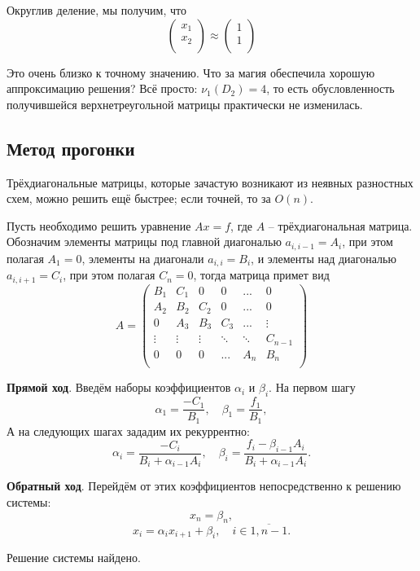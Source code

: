 \documentclass{article}
\begin{document}
\begin{example}
	Округлив деление, мы получим, что
	\[
		\begin{pmatrix}
			x_1 \\
			x_2 \\
		\end{pmatrix}
		\approx
		\begin{pmatrix}
			1 \\
			1 \\
		\end{pmatrix}
	\]

	Это очень близко к точному значению. Что за магия обеспечила хорошую
	аппроксимацию решения? Всё просто: $\nu_1(D_2)=4$, то есть
	обусловленность получившейся верхнетреугольной матрицы практически не
	изменилась.
\end{example}
\leavevmode

\subsection{Метод прогонки}
Трёхдиагональные матрицы, которые зачастую возникают из неявных разностных схем,
можно решить ещё быстрее; если точней, то за $O(n)$.

\begin{algorithm}
	Пусть необходимо решить уравнение $Ax=f$, где $A$ -- трёхдиагональная
	матрица. Обозначим элементы матрицы
	под главной диагональю $a_{i,i-1}=A_i$, при этом полагая $A_1=0$,
	элементы на диагонали $a_{i,i}=B_i$,
	и элементы над диагональю $a_{i,i+1}=C_i$, при этом полагая $C_n=0$,
	тогда матрица примет вид
	\[
		A=
		\begin{pmatrix}
			B_1	& C_1	& 0	& 0	& ...	& 0 \\
			A_2	& B_2	& C_2	& 0	& ...	& 0 \\
			0	& A_3	& B_3	& C_3	& ...	& \vdots\\
			\vdots	& \vdots& \vdots& \ddots& \ddots& C_{n-1} \\
			0	& 0	& 0	& ...	& A_n	& B_n\\
		\end{pmatrix}
	\]

	\textbf{Прямой ход}.
	Введём наборы коэффициентов $\alpha_i$ и $\beta_i$. На первом шагу
	\[\alpha_1=\frac{-C_1}{B_1},\quad \beta_1=\frac{f_1}{B_1},\]
	А на следующих шагах зададим их рекуррентно:
	\[\alpha_i=\frac{-C_i}{B_i+\alpha_{i-1}A_i},\quad
	\beta_i=\frac{f_i-\beta_{i-1}A_i}{B_i+\alpha_{i-1}A_i}.\]

	\textbf{Обратный ход}.
	Перейдём от этих коэффициентов непосредственно к решению системы:
	\[x_n=\beta_n,\]
	\[x_i=\alpha_i x_{i+1}+\beta_i,\quad i\in\overline{1,n-1}.\]

	Решение системы найдено.
\end{algorithm}
\end{document}

